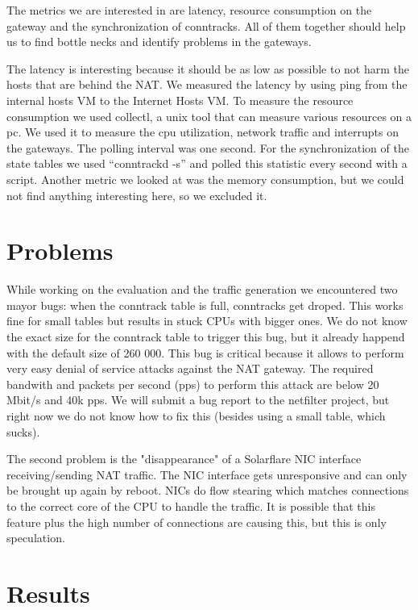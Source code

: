\documentclass{report}
\begin{document}
The metrics we are interested in are latency, resource consumption on
the gateway and the synchronization of conntracks. All of them together
should help us to find bottle necks and identify problems in the
gateways.

The latency is interesting because it should be as low as possible to
not harm the hosts that are behind the NAT. We measured the latency by
using ping\cite{ping} from the internal hosts VM to the Internet Hosts VM.
To measure the resource consumption we used collectl\cite{collectl}, a unix tool that
can measure various resources on a pc. We used it to measure the cpu
utilization, network traffic and interrupts on the gateways. The polling
interval was one second. For the synchronization of the state tables we
used ``conntrackd -s'' and polled this statistic every second with a
script. Another metric we looked at was the memory consumption, but we
could not find anything interesting here, so we excluded it.


\section{Problems}
While working on the evaluation and the traffic generation we encountered two mayor bugs: 
when the conntrack table is full, conntracks get droped. This works fine for small tables 
but results in stuck CPUs with bigger ones. We do not know the exact size for the conntrack
table to trigger this bug, but it already happend with the default size of 260 000. This bug 
is critical because it allows to perform very easy denial of service attacks against the NAT 
gateway. The required bandwith and packets per second (pps) to perform this attack are below
20 Mbit/s and 40k pps. We will submit a bug report to the netfilter project, but right now we do
not know how to fix this (besides using a small table, which sucks). 

The second problem is the "disappearance" of a Solarflare NIC interface receiving/sending
NAT traffic. The NIC interface gets unresponsive and can only be brought up again by reboot. NICs 
do flow stearing which matches connections to the correct core of the CPU to handle the traffic.
It is possible that this feature plus the high number of connections are causing this, but this is only
speculation. 

\section{Results}\label{results}
\end{document}
